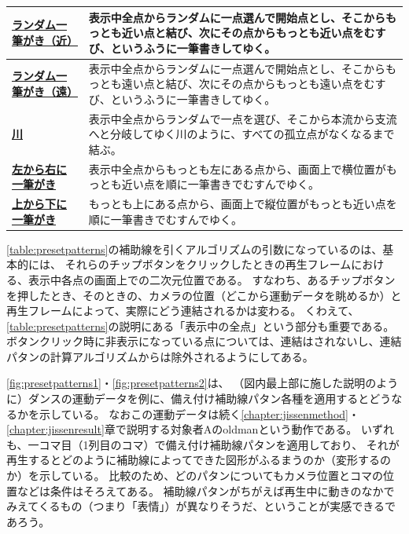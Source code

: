 \begin{table}[H]
\begin{center}
\begin{tabularx}{\textwidth}{>{\bfseries}lX}
    \hline
    \href{https://takahitohoriuchi.github.io/hj-playground_gallery/pattern_randomchikai.html}{ランダム一筆がき（近）} & 表示中全点からランダムに一点選んで開始点とし、そこからもっとも近い点と結び、次にその点からもっとも近い点をむすび、というふうに一筆書きしてゆく。 \\
    \hline
    \href{https://takahitohoriuchi.github.io/hj-playground_gallery/pattern_randomtooi.html}{ランダム一筆がき（遠）} & 表示中全点からランダムに一点選んで開始点とし、そこからもっとも遠い点と結び、次にその点からもっとも遠い点をむすび、というふうに一筆書きしてゆく。\\
    \hline
    \href{https://takahitohoriuchi.github.io/hj-playground_gallery/pattern_kawa.html}{川} & 表示中全点からランダムで一点を選び、そこから本流から支流へと分岐してゆく川のように、すべての孤立点がなくなるまで結ぶ。 \\
    \hline
    \href{https://takahitohoriuchi.github.io/hj-playground_gallery/pattern_hitofudeyoko.html}{左から右に一筆がき} & 表示中全点からもっとも左にある点から、画面上で横位置がもっとも近い点を順に一筆書きでむすんでゆく。 \\
    \hline
    \href{https://takahitohoriuchi.github.io/hj-playground_gallery/pattern_hitofudetate.html}{上から下に一筆がき} & もっとも上にある点から、画面上で縦位置がもっとも近い点を順に一筆書きでむすんでゆく。 \\
    \hline
  \end{tabularx}
  \end{center}
\end{table}


\autoref{table:presetpatterns}の補助線を引くアルゴリズムの引数になっているのは、基本的には、
それらのチップボタンをクリックしたときの再生フレームにおける、表示中各点の画面上での二次元位置である。
すなわち、あるチップボタンを押したとき、そのときの、カメラの位置（どこから運動データを眺めるか）と再生フレームによって、実際にどう連結されるかは変わる。
くわえて、\autoref{table:presetpatterns}の説明にある「表示中の全点」という部分も重要である。
ボタンクリック時に非表示になっている点については、連結はされないし、連結パタンの計算アルゴリズムからは除外されるようにしてある。

\autoref{fig:presetpatterns1}・\autoref{fig:presetpatterns2}は、
（図内最上部に施した説明のように）ダンスの運動データを例に、備え付け補助線パタン各種を適用するとどうなるかを示している。
なおこの運動データは続く\ref{chapter:jissenmethod}・\ref{chapter:jissenresult}章で説明する対象者Aのoldmanという動作である。
いずれも、一コマ目（1列目のコマ）で備え付け補助線パタンを適用しており、
それが再生するとどのように補助線によってできた図形がふるまうのか（変形するのか）を示している。
比較のため、どのパタンについてもカメラ位置とコマの位置などは条件はそろえてある。
補助線パタンがちがえば再生中に動きのなかでみえてくるもの（つまり「表情」）が異なりそうだ、ということが実感できるであろう。


